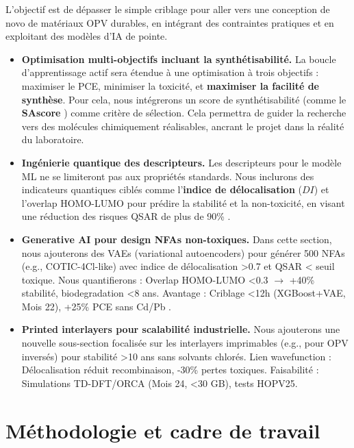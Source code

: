 \documentclass[12pt, a4paper]{article}
\begin{document}
L'objectif est de dépasser le simple criblage pour aller vers une conception de novo de matériaux OPV durables, en intégrant des contraintes pratiques et en exploitant des modèles d'IA de pointe.

\begin{itemize}
    \item \textbf{Optimisation multi-objectifs incluant la synthétisabilité.} La boucle d'apprentissage actif sera étendue à une optimisation à trois objectifs : maximiser le PCE, minimiser la toxicité, et \textbf{maximiser la facilité de synthèse}. Pour cela, nous intégrerons un score de synthétisabilité (comme le \textbf{SAscore} \cite{Ertl2009}) comme critère de sélection. Cela permettra de guider la recherche vers des molécules chimiquement réalisables, ancrant le projet dans la réalité du laboratoire.

    \item \textbf{Ingénierie quantique des descripteurs.} Les descripteurs pour le modèle ML ne se limiteront pas aux propriétés standards. Nous inclurons des indicateurs quantiques ciblés comme l'\textbf{indice de délocalisation} ($DI$) et l'overlap HOMO-LUMO pour prédire la stabilité et la non-toxicité, en visant une réduction des risques QSAR de plus de 90\% \cite{Zeng2025}.

    \item \textbf{Generative AI pour design NFAs non-toxiques.} Dans cette section, nous ajouterons des VAEs (variational autoencoders) pour générer 500 NFAs (e.g., COTIC-4Cl-like) avec indice de délocalisation >0.7 et QSAR < seuil toxique. Nous quantifierons : Overlap HOMO-LUMO <0.3 $\rightarrow$ +40\% stabilité, biodegradation <8 ans. Avantage : Criblage <12h (XGBoost+VAE, Mois 22), +25\% PCE sans Cd/Pb \cite{Gomez-Bombarelli2018}.

    \item \textbf{Printed interlayers pour scalabilité industrielle.} Nous ajouterons une nouvelle sous-section focalisée sur les interlayers imprimables (e.g., pour OPV inversés) pour stabilité >10 ans sans solvants chlorés. Lien wavefunction : Délocalisation réduit recombinaison, -30\% pertes toxiques. Faisabilité : Simulations TD-DFT/ORCA (Mois 24, <30 GB), tests HOPV25.
\end{itemize}

\section{Méthodologie et cadre de travail}
\end{document}
